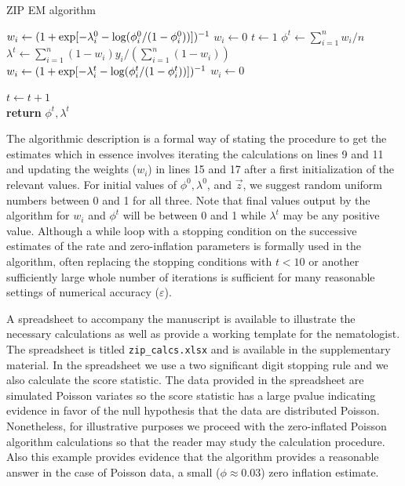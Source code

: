 \documentclass{article}
\begin{document}
\begin{algorithm}
\caption{ZIP EM algorithm}\label{alg:zip_em}
\begin{algorithmic}[1]
  		\State $w_i \gets (1+\exp[-\lambda_i^0 -\textnormal{log}(\phi_i^0/(1-\phi_i^0))])^{-1}$ 
	\Else 
  		\State $w_i \gets 0$ 
 	\EndIf
\EndFor
\State $t \gets 1$
\State $\phi^t \gets \sum_{i=1}^nw_i/n $\\
\State $\lambda^t \gets \sum_{i=1}^n(1-w_i)y_i /\left(\sum_{i=1}^n(1-w_i)\right) $\\
  		\State $w_i \gets (1+\exp[-\lambda_i^t -\textnormal{log}(\phi_i^t/(1-\phi_i^t))])^{-1}$ 
	\Else 
  		\State $w_i \gets 0$ 
 	\EndIf
\EndFor

\State $t\gets t+1$\\
\EndWhile
\State \textbf{return} $\phi^t, \lambda^t$\\
\EndProcedure
\end{algorithmic}
\end{algorithm}
The algorithmic description is a formal way of stating the procedure to get the estimates which in essence involves iterating the calculations on lines 9 and 11 and updating the weights ($w_i$) in lines 15 and 17 after a first initialization of the relevant values. For initial values of $\phi^0, \lambda^0$, and $\vec{z}$, we suggest random uniform numbers between 0 and 1 for all three. Note that final values output by the algorithm for $w_i$ and $\phi^t$ will be between 0 and 1 while $\lambda^t$ may be any positive value. Although a while loop with a stopping condition on the successive estimates of the rate and zero-inflation parameters is formally used in the algorithm, often replacing the stopping conditions with $t<10$ or another sufficiently large whole number of iterations is sufficient for many reasonable settings of numerical accuracy ($\varepsilon$). 

A spreadsheet to accompany the manuscript is available to illustrate the necessary calculations as well as provide a working template for the nematologist. The spreadsheet is titled \texttt{zip\_calcs.xlsx} and is available in the supplementary material. In the spreadsheet we use a two significant digit stopping rule and we also calculate the score statistic. The data provided in the spreadsheet are simulated Poisson variates so the score statistic has a large pvalue indicating evidence in favor of the null hypothesis that the data are distributed Poisson. Nonetheless, for illustrative purposes we proceed with the zero-inflated Poisson algorithm calculations so that the reader may study the calculation procedure. Also this example provides evidence that the algorithm provides a reasonable answer in the case of Poisson data, a small ($\phi \approx 0.03$) zero inflation estimate. 




 
\end{document}
